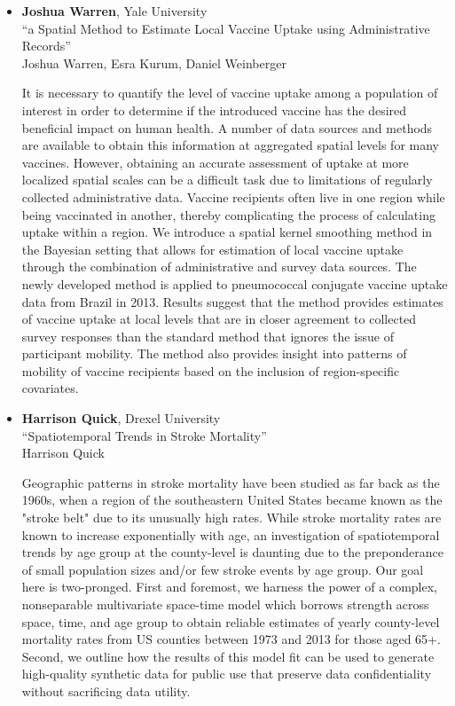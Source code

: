 \begin{itemize}
\item \textbf{Joshua Warren}, Yale University \\
``a Spatial Method to Estimate Local Vaccine Uptake using Administrative Records'' \\
Joshua Warren, Esra Kurum, Daniel Weinberger


It is necessary to quantify the level of vaccine uptake among a population of interest in order to determine if the introduced vaccine has the desired beneficial impact on human health.  A number of data sources and methods are available to obtain this information at aggregated spatial levels for many vaccines.  However, obtaining an accurate assessment of uptake at more localized spatial scales can be a difficult task due to limitations of regularly collected administrative data.  Vaccine recipients often live in one region while being vaccinated in another, thereby complicating the process of calculating uptake within a region.  We introduce a spatial kernel smoothing method in the Bayesian setting that allows for estimation of local vaccine uptake through the combination of administrative and survey data sources.  The newly developed method is applied to pneumococcal conjugate vaccine uptake data from Brazil in 2013.  Results suggest that the method provides estimates of vaccine uptake at local levels that are in closer agreement to collected survey responses than the standard method that ignores the issue of participant mobility.  The method also provides insight into patterns of mobility of vaccine recipients based on the inclusion of region-specific covariates.         

\item \textbf{Harrison Quick}, Drexel University \\
``Spatiotemporal Trends in Stroke Mortality'' \\
Harrison Quick


Geographic patterns in stroke mortality have been studied as far back as the 1960s, when a region of the southeastern United States became known as the "stroke belt" due to its unusually high rates. While stroke mortality rates are known to increase exponentially with age, an investigation of spatiotemporal trends by age group at the county-level is daunting due to the preponderance of small population sizes and/or few stroke events by age group. Our goal here is two-pronged.  First and foremost, we harness the power of a complex, nonseparable multivariate space-time model which borrows strength across space, time, and age group to obtain reliable estimates of yearly county-level mortality rates from US counties between 1973 and 2013 for those aged 65+. Second, we outline how the results of this model fit can be used to generate high-quality synthetic data for public use that preserve data confidentiality without sacrificing data utility.


\end{itemize}
